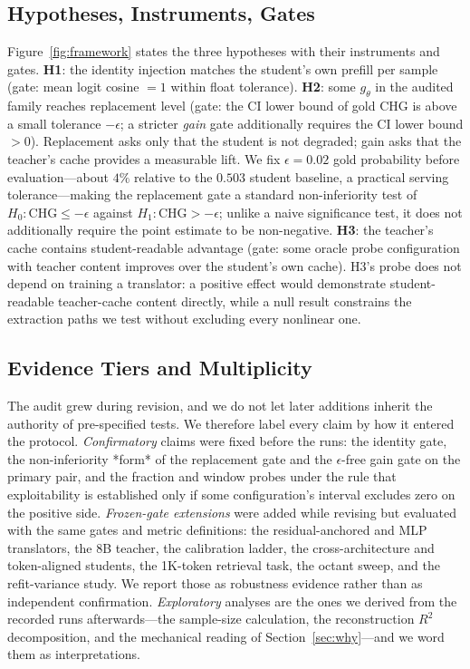 \documentclass[10pt]{article}
\newcommand{\chg}{\mathrm{CHG}}
\begin{document}
\subsection{Hypotheses, Instruments, Gates}
Figure~\ref{fig:framework} states the three hypotheses with their instruments
and gates. \textbf{H1}: the identity injection matches the student's own
prefill per sample (gate: mean logit cosine $= 1$ within float tolerance).
\textbf{H2}: some $g_\theta$ in the audited family reaches replacement level
(gate: the CI lower bound of gold CHG is above a small tolerance $-\epsilon$; a
stricter \emph{gain} gate additionally requires the CI lower bound $> 0$).
Replacement asks only that the student is not degraded; gain asks that the
teacher's cache provides a measurable lift. We fix $\epsilon = 0.02$ gold
probability before evaluation---about $4\%$ relative to the $0.503$ student
baseline, a practical serving tolerance---making the replacement gate a
standard non-inferiority test of $H_0\colon \chg \le -\epsilon$ against
$H_1\colon \chg > -\epsilon$; unlike a naive significance test, it does not
additionally require the point estimate to be non-negative. \textbf{H3}: the teacher's cache contains student-readable
advantage (gate: some oracle probe configuration with teacher content
improves over the student's own cache). H3's probe does not depend on training
a translator: a positive effect would demonstrate student-readable
teacher-cache content directly, while a null result constrains the extraction
paths we test without excluding every nonlinear one.

\subsection{Evidence Tiers and Multiplicity}
\label{sec:tiers}
The audit grew during revision, and we do not let later additions inherit the
authority of pre-specified tests. We therefore label every claim by how it
entered the protocol. \emph{Confirmatory} claims were fixed before the runs: the
identity gate, the non-inferiority *form* of the replacement gate and the $\epsilon$-free gain
gate on the primary pair, and the fraction and window probes under the rule that
exploitability is established only if some configuration's interval excludes
zero on the positive side. \emph{Frozen-gate extensions} were added while
revising but evaluated with the same gates and metric definitions: the
residual-anchored and MLP translators, the 8B teacher, the calibration ladder,
the cross-architecture and token-aligned students, the 1K-token retrieval task, the
octant sweep, and the refit-variance study. We report those as robustness
evidence rather than as independent confirmation. \emph{Exploratory} analyses
are the ones we derived from the recorded runs afterwards---the sample-size
calculation, the reconstruction $R^2$ decomposition, and the mechanical reading
of Section~\ref{sec:why}---and we word them as interpretations.
\end{document}
